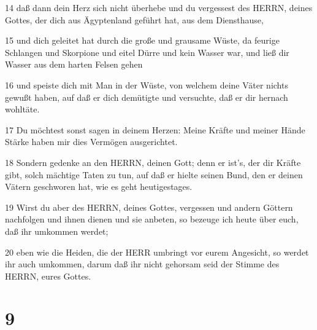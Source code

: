 \par 14 daß dann dein Herz sich nicht überhebe und du vergessest des HERRN, deines Gottes, der dich aus Ägyptenland geführt hat, aus dem Diensthause,
\par 15 und dich geleitet hat durch die große und grausame Wüste, da feurige Schlangen und Skorpione und eitel Dürre und kein Wasser war, und ließ dir Wasser aus dem harten Felsen gehen
\par 16 und speiste dich mit Man in der Wüste, von welchem deine Väter nichts gewußt haben, auf daß er dich demütigte und versuchte, daß er dir hernach wohltäte.
\par 17 Du möchtest sonst sagen in deinem Herzen: Meine Kräfte und meiner Hände Stärke haben mir dies Vermögen ausgerichtet.
\par 18 Sondern gedenke an den HERRN, deinen Gott; denn er ist's, der dir Kräfte gibt, solch mächtige Taten zu tun, auf daß er hielte seinen Bund, den er deinen Vätern geschworen hat, wie es geht heutigestages.
\par 19 Wirst du aber des HERRN, deines Gottes, vergessen und andern Göttern nachfolgen und ihnen dienen und sie anbeten, so bezeuge ich heute über euch, daß ihr umkommen werdet;
\par 20 eben wie die Heiden, die der HERR umbringt vor eurem Angesicht, so werdet ihr auch umkommen, darum daß ihr nicht gehorsam seid der Stimme des HERRN, eures Gottes.

\chapter{9}

